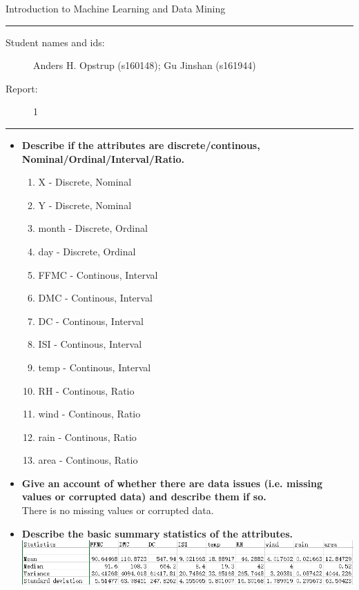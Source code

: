\documentclass[11pt]{article}
\begin{document}
\begin{center}
{{\Large \sc Introduction to Machine Learning and Data Mining}}
\end{center}
\rule{\textwidth}{1pt}
\begin{description}
\item[Student names and ids:] Anders H. Opstrup (s160148); Gu Jinshan (s161944)
\item[Report:] 1
\end{description}
\rule{\textwidth}{1pt}



\begin{itemize}
\item \textbf{Describe if the attributes are discrete/continous, Nominal/Ordinal/Interval/Ratio.}
	\begin{enumerate}
	\item X - Discrete, Nominal
	\item Y - Discrete, Nominal
	\item month - Discrete, Ordinal
	\item day - Discrete, Ordinal
	\item FFMC - Continous, Interval
	\item DMC - Continous, Interval
	\item DC - Continous, Interval
	\item ISI - Continous, Interval
	\item temp - Continous, Interval
	\item RH - Continous, Ratio
	\item wind - Continous, Ratio
	\item rain - Continous, Ratio
	\item area - Continous, Ratio
	\end{enumerate}
\item \textbf{Give an account of whether there are data issues (i.e. missing values or corrupted data) and describe them if so.}\\
There is no missing values or corrupted data.
\item \textbf{Describe the basic summary statistics of the attributes.}\\
\includegraphics[width=\textwidth]{summary_statistics.png}
\end{itemize}
	


\end{document}
